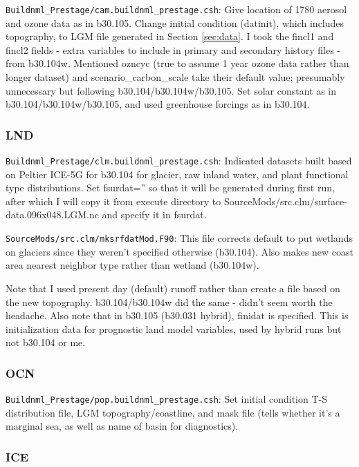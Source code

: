 \documentclass[authoryear,round,12pt]{article}
\begin{document}
\verb+Buildnml_Prestage/cam.buildnml_prestage.csh+: Give location of
1780 aerosol and ozone data as in b30.105. Change initial condition
(datinit), which includes topography, to LGM file generated in Section
\ref{sec:data}. I took the fincl1 and fincl2 fields - extra variables
to include in primary and secondary history files - from
b30.104w. Mentioned ozncyc (true to assume 1 year ozone data rather
than longer dataset) and scenario\_carbon\_scale take their default
value; presumably unnecessary but following b30.104/b30.104w/b30.105.
Set solar constant as in b30.104/b30.104w/b30.105, and used greenhouse
forcings as in b30.104.

\subsubsection{LND}

\verb+Buildnml_Prestage/clm.buildnml_prestage.csh+: Indicated datasets
built based on Peltier ICE-5G for b30.104 for glacier, raw inland
water, and plant functional type distributions. Set fsurdat='' so that
it will be generated during first run, after which I will copy it from
execute directory to SourceMods/src.clm/surface-data.096x048.LGM.nc
and specify it in fsurdat.

\verb+SourceMods/src.clm/mksrfdatMod.F90+: This file corrects default
to put wetlands on glaciers since they weren't specified otherwise
(b30.104).  Also makes new coast area nearest neighbor type rather
than wetland (b30.104w).

Note that I used present day (default) runoff rather than create a
file based on the new topography. b30.104/b30.104w did the same -
didn't seem worth the headache. Also note that in b30.105 (b30.031
hybrid), finidat is specified. This is initialization data for
prognostic land model variables, used by hybrid runs but not b30.104
or me.

\subsubsection{OCN}

\verb+Buildnml_Prestage/pop.buildnml_prestage.csh+: Set initial
condition T-S distribution file, LGM topography/coastline, and mask
file (tells whether it's a marginal sea, as well as name of basin for
diagnostics).

\subsubsection{ICE}
\end{document}
